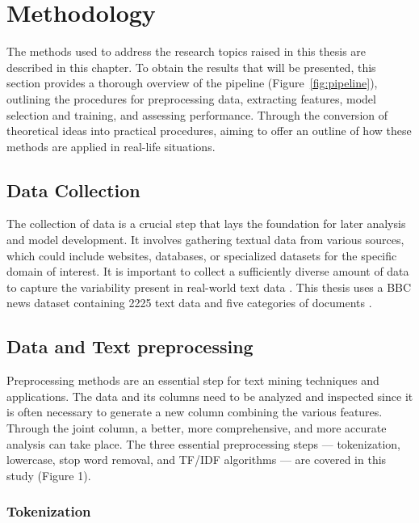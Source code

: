 \chapter{Methodology}

The methods used to address the research topics raised in this thesis are described in this chapter. To obtain the results that will be presented, this section provides a thorough overview of the pipeline (Figure~\ref{fig:pipeline}), outlining the procedures for preprocessing data, extracting features, model selection and training, and assessing performance. Through the conversion of theoretical ideas into practical procedures, aiming to offer an outline of how these methods are applied in real-life situations.


\section{Data Collection}

The collection of data is a crucial step that lays the foundation for later analysis and model development. It involves gathering textual data from various sources, which could include websites, databases, or specialized datasets for the specific domain of interest. It is important to collect a sufficiently diverse amount of data to capture the variability present in real-world text data \citep{openai_gpt3}. This thesis uses a BBC news dataset containing 2225 text data and five categories of documents \citep{text_dataset}. 

\section{Data and Text preprocessing}

Preprocessing methods are an essential step for text mining techniques and applications. 
The data and its columns need to be analyzed and inspected since it is often necessary to generate a new column combining the various features. Through the joint column, a better, more comprehensive, and more accurate analysis can take place. The three essential preprocessing steps — tokenization, lowercase, stop word removal, and TF/IDF algorithms — are covered in this study (Figure 1).

\subsection{Tokenization}

